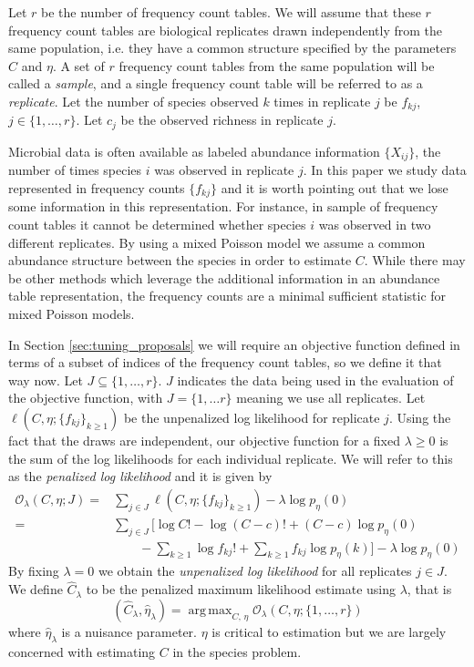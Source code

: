 \documentclass[oupdraft]{bio}
\DeclareMathOperator*{\argmax}{arg\,max}
\begin{document}
Let $r$ be the number of frequency count tables.  We will assume that these $r$ frequency count tables are biological replicates drawn independently from the same population, i.e. they have a common structure specified by the parameters $C$ and $\eta$.  A set of $r$ frequency count tables from the same population will be called a \textit{sample}, and a single frequency count table will be referred to as a \textit{replicate}.  Let the number of species observed $k$ times in replicate $j$ be $f_{kj}$, $j \in \{1, \dots , r\}$.  Let $c_j$ be the observed richness in replicate $j$.

Microbial data is often available as labeled abundance information $\{ X_{ij} \}$, the number of times species $i$ was observed in replicate $j$.  In this paper we study data represented in frequency counts $\{f_{kj}\}$ and it is worth pointing out that we lose some information in this representation.  For instance, in sample of frequency count tables it cannot be determined whether species $i$ was observed in two different replicates.  By using a mixed Poisson model we assume a common abundance structure between the species in order to estimate $C$.  While there may be other methods which leverage the additional information in an abundance table representation, the frequency counts are a minimal sufficient statistic for mixed Poisson models.

In Section \ref{sec:tuning_proposals} we will require an objective function defined in terms of a subset of indices of the frequency count tables, so we define it that way now.  Let $J \subseteq \{1, \dots, r\}$.  $J$ indicates the data being used in the evaluation of the objective function, with $J = \{1, \dots r\}$ meaning we use all replicates.  Let $\ell \left(C, \eta; \{f_{kj}\}_{k \geq 1} \right)$ be the unpenalized log likelihood for replicate $j$.  Using the fact that the draws are independent, our objective function for a fixed $\lambda \geq 0$ is the sum of the log likelihoods for each individual replicate.  We will refer to this as the \textit{penalized log likelihood} and it is given by
\begin{align}
\mathcal{O}_{\lambda}(C, \eta; J) =& \sum_{j \in J} \ell \left(C, \eta; \{f_{kj}\}_{k \geq 1} \right) - \lambda\log p_{\eta}(0) \\
 =& \sum_{j \in J} \biggl[ \log C! - \log (C-c)! + (C-c) \log p_\eta(0)  \nonumber \\
 & \qquad  - \sum_{k \geq 1} \log{} f_{kj}! + \sum_{k \geq 1} f_{kj} \log p_\eta(k) \biggr] - \lambda \log p_\eta(0)    \label{eq:objective}
\end{align}
By fixing $\lambda = 0$ we obtain the \textit{unpenalized log likelihood} for all replicates $j \in J$.  We define $\widehat{C}_{\lambda}$ to be the penalized maximum likelihood estimate using $\lambda$, that is
\begin{equation}
\left(\widehat{C}_{\lambda},  \widehat{\eta}_{\lambda} \right) = \argmax_{C, \, \eta}  \mathcal{O}_{\lambda} \left(C, \eta ; \{1, \dots , r\} \right) \label{eq:ccc_hat_lambda}
\end{equation}
where $\widehat{\eta}_{\lambda}$ is a nuisance parameter.  $\eta$ is critical to estimation but we are largely concerned with estimating $C$ in the species problem.
\end{document}
